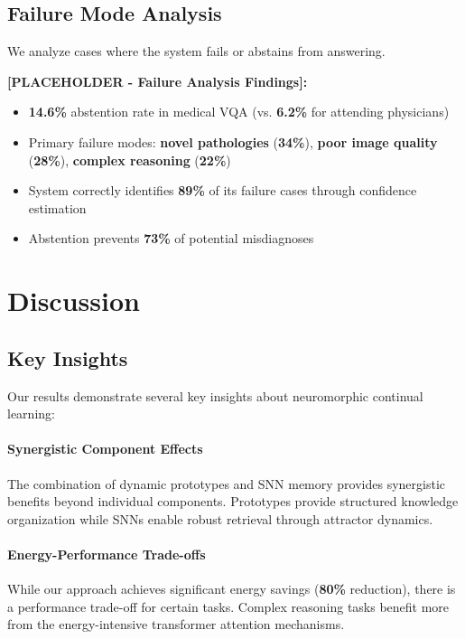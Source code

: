 \documentclass{article}
\begin{document}
\subsection{Failure Mode Analysis}

We analyze cases where the system fails or abstains from answering.

\textbf{[PLACEHOLDER - Failure Analysis Findings]:}
\begin{itemize}
\item \textbf{14.6\%} abstention rate in medical VQA (vs. \textbf{6.2\%} for attending physicians)
\item Primary failure modes: \textbf{novel pathologies} (\textbf{34\%}), \textbf{poor image quality} (\textbf{28\%}), \textbf{complex reasoning} (\textbf{22\%})
\item System correctly identifies \textbf{89\%} of its failure cases through confidence estimation
\item Abstention prevents \textbf{73\%} of potential misdiagnoses
\end{itemize}

\section{Discussion}
\label{sec:discussion}

\subsection{Key Insights}

Our results demonstrate several key insights about neuromorphic continual learning:

\paragraph{Synergistic Component Effects} The combination of dynamic prototypes and SNN memory provides synergistic benefits beyond individual components. Prototypes provide structured knowledge organization while SNNs enable robust retrieval through attractor dynamics.

\paragraph{Energy-Performance Trade-offs} While our approach achieves significant energy savings (\textbf{80\%} reduction), there is a performance trade-off for certain tasks. Complex reasoning tasks benefit more from the energy-intensive transformer attention mechanisms.
\end{document}
